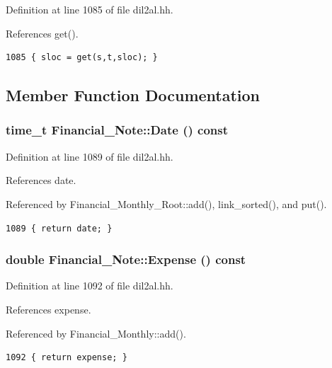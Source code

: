 Definition at line 1085 of file dil2al.hh.

References get().



\footnotesize\begin{verbatim}1085 { sloc = get(s,t,sloc); }
\end{verbatim}\normalsize 


\subsection{Member Function Documentation}
\subsubsection{\setlength{\rightskip}{0pt plus 5cm}time\_\-t Financial\_\-Note::Date () const\hspace{0.3cm}{\tt  [inline]}}\label{classFinancial__Note_a6}




Definition at line 1089 of file dil2al.hh.

References date.

Referenced by Financial\_\-Monthly\_\-Root::add(), link\_\-sorted(), and put().



\footnotesize\begin{verbatim}1089 { return date; }
\end{verbatim}\normalsize 
{}
\subsubsection{\setlength{\rightskip}{0pt plus 5cm}double Financial\_\-Note::Expense () const\hspace{0.3cm}{\tt  [inline]}}\label{classFinancial__Note_a9}




Definition at line 1092 of file dil2al.hh.

References expense.

Referenced by Financial\_\-Monthly::add().



\footnotesize\begin{verbatim}1092 { return expense; }
\end{verbatim}\normalsize 
{}
